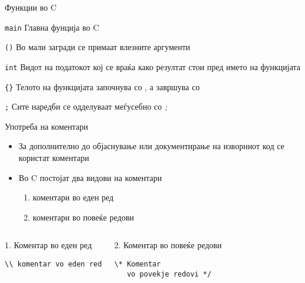 \begin{frame}[shrink=10]{Функции во C}
    \hfill
    \begin{block}{\texttt{main}}
        Главна фунција во C
    \end{block}
    
    \begin{block}{\texttt{()}}
        Во мали загради се примаат влезните аргументи
    \end{block}
    
    \begin{block}{\texttt{int}}
        Видот на податокот кој се враќа како резултат стои пред името на функцијата
    \end{block}
    
    \begin{block}{\texttt{\{\}}}
        Телото на функцијата започнува со {, а завршува со }
    \end{block}

    \begin{block}{\texttt{;}}
    Сите наредби се одделуваат меѓусебно со \emph{;}
    \end{block}

\end{frame}

\begin{frame}[fragile]{Употреба на коментари}
    \begin{itemize}
        \item За дополнително до објаснување или документирање на изворниот код се користат коментари
        \item Во C постојат два видови на коментари
        \begin{enumerate}
            \item коментари во еден ред
            \item коментари во повеќе редови
        \end{enumerate} 
        
    \end{itemize}
        
    \begin{columns}[t]
            \begin{block}{1. Коментар во еден ред}
\begin{verbatim}
\\ komentar vo eden red
\end{verbatim}
            \end{block}
            \begin{block}{2. Коментар во повеќе редови}
\begin{verbatim}
\* Komentar 
   vo povekje redovi */
\end{verbatim}
            \end{block}
    \end{columns}       

\end{frame}

